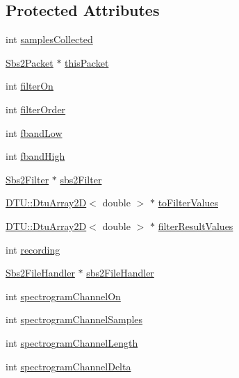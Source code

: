 \subsection*{Protected Attributes}
\begin{DoxyCompactItemize}
\item 
int \hyperlink{classSbs2DataHandler_a283d44a7f76c0943073e4b1e1f3a47e0}{samples\-Collected}
\item 
\hyperlink{classSbs2Packet}{Sbs2\-Packet} $\ast$ \hyperlink{classSbs2DataHandler_a7978367be1b4e77d29bd070749f9b90b}{this\-Packet}
\item 
int \hyperlink{classSbs2DataHandler_ac98441bbba779fc5d545b91fff4fe4af}{filter\-On}
\item 
int \hyperlink{classSbs2DataHandler_a3950a87e3197897c454f36a6e0cbe0c2}{filter\-Order}
\item 
int \hyperlink{classSbs2DataHandler_aa151649a496b0c6fb4fff0504de0cb84}{fband\-Low}
\item 
int \hyperlink{classSbs2DataHandler_a97a3294b785f95342192060884b7a51f}{fband\-High}
\item 
\hyperlink{classSbs2Filter}{Sbs2\-Filter} $\ast$ \hyperlink{classSbs2DataHandler_ab4ff2034bf7974feac4655767ffb2f06}{sbs2\-Filter}
\item 
\hyperlink{classDTU_1_1DtuArray2D}{D\-T\-U\-::\-Dtu\-Array2\-D}$<$ double $>$ $\ast$ \hyperlink{classSbs2DataHandler_a945b3c5c16c586b7ea7c3fa2a61f1314}{to\-Filter\-Values}
\item 
\hyperlink{classDTU_1_1DtuArray2D}{D\-T\-U\-::\-Dtu\-Array2\-D}$<$ double $>$ $\ast$ \hyperlink{classSbs2DataHandler_ab59d6276b75e1b28c622cfd013c8cf8d}{filter\-Result\-Values}
\item 
int \hyperlink{classSbs2DataHandler_ae6505076adb777fb2786f5cf1cc4caa5}{recording}
\item 
\hyperlink{classSbs2FileHandler}{Sbs2\-File\-Handler} $\ast$ \hyperlink{classSbs2DataHandler_a21a05a8191f99d973e03949016cc6362}{sbs2\-File\-Handler}
\item 
int \hyperlink{classSbs2DataHandler_a6aec777856b21566fc7c1c239bc01a6e}{spectrogram\-Channel\-On}
\item 
int \hyperlink{classSbs2DataHandler_ae19dc07959f3dfedbdd020c8ecaa1b20}{spectrogram\-Channel\-Samples}
\item 
int \hyperlink{classSbs2DataHandler_aac9d4579ad6b4d84e205ccf834bccf79}{spectrogram\-Channel\-Length}
\item 
int \hyperlink{classSbs2DataHandler_a2ca4e80598926e06fb224c985a0000f1}{spectrogram\-Channel\-Delta}

\end{DoxyCompactItemize}
